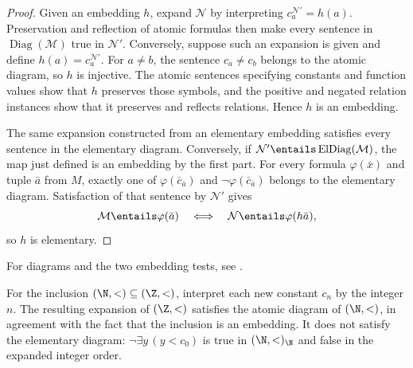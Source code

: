 \begin{proof}
Given an embedding \(h\), expand \(\mathcal N\) by interpreting
\(c_a^{\mathcal N'}=h(a)\).  Preservation and reflection of atomic formulas
then make every sentence in \(\operatorname{Diag}(\mathcal M)\) true in
\(\mathcal N'\).  Conversely, suppose such an expansion is given and define
\(h(a)=c_a^{\mathcal N'}\).  For \(a\ne b\), the sentence
\(c_a\ne c_b\) belongs to the atomic diagram, so \(h\) is injective.  The
atomic sentences specifying constants and function values show that \(h\)
preserves those symbols, and the positive and negated relation instances show
that it preserves and reflects relations.  Hence \(h\) is an embedding.

The same expansion constructed from an elementary embedding satisfies every
sentence in the elementary diagram.  Conversely, if
\(\mathcal N'\entails\operatorname{ElDiag}(\mathcal M)\), the map just
defined is an embedding by the first part.  For every formula
\(\varphi(\bar x)\) and tuple \(\bar a\) from \(M\), exactly one of
\(\varphi(\bar c_{\bar a})\) and
\(\neg\varphi(\bar c_{\bar a})\) belongs to the elementary diagram.
Satisfaction of that sentence by \(\mathcal N'\) gives
\[
  \mathcal M\entails\varphi(\bar a)
  \quad\Longleftrightarrow\quad
  \mathcal N\entails\varphi(h\bar a),
\]
so \(h\) is elementary.
\end{proof}

For diagrams and the two embedding tests, see
\cite{Hodges1993,Marker2002}.

\begin{example}
For the inclusion \((\N,<)\subseteq(\Z,<)\), interpret each new constant
\(c_n\) by the integer \(n\).  The resulting expansion of \((\Z,<)\)
satisfies the atomic diagram of \((\N,<)\), in agreement with the fact that
the inclusion is an embedding.  It does not satisfy the elementary diagram:
\(\neg\exists y\,(y<c_0)\) is true in \((\N,<)_{\N}\) and false in the
expanded integer order.
\end{example}

